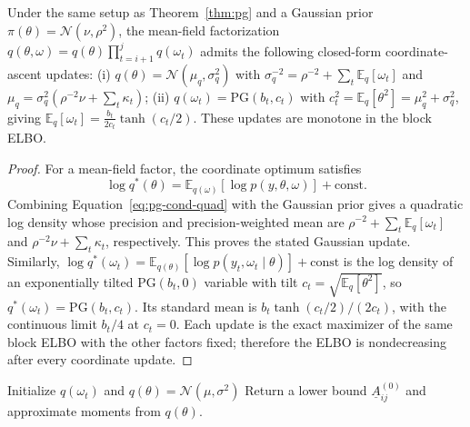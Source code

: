 \begin{proposition}
\label{prop:pg-mf}
Under the same setup as Theorem~\ref{thm:pg} and a Gaussian prior $\pi(\theta)=\mathcal{N}(\nu,\rho^2)$,
the mean-field factorization $q(\theta,\omega)=q(\theta)\prod_{t=i+1}^j q(\omega_t)$ admits the
following closed-form coordinate-ascent updates:
(i) $q(\theta)=\mathcal{N}(\mu_q,\sigma_q^2)$ with
$\sigma_q^{-2}=\rho^{-2}+\sum_t \mathbb{E}_q[\omega_t]$ and
$\mu_q=\sigma_q^2(\rho^{-2}\nu+\sum_t \kappa_t)$;
(ii) $q(\omega_t)=\mathrm{PG}(b_t, c_t)$ with $c_t^2=\mathbb{E}_q[\theta^2]=\mu_q^2+\sigma_q^2$,
giving $\mathbb{E}_q[\omega_t]=\tfrac{b_t}{2 c_t}\tanh(c_t/2)$. These updates are monotone in the
block ELBO.
\end{proposition}

\begin{proof}
For a mean-field factor, the coordinate optimum satisfies
\[
\log q^*(\theta)
=\mathbb E_{q(\omega)}\!\left[\log p(y,\theta,\omega)\right]+\mathrm{const}.
\]
Combining Equation~\eqref{eq:pg-cond-quad} with the Gaussian prior gives a quadratic log density
whose precision and precision-weighted mean are
$\rho^{-2}+\sum_t\mathbb E_q[\omega_t]$ and
$\rho^{-2}\nu+\sum_t\kappa_t$, respectively. This proves the stated Gaussian update. Similarly,
$\log q^*(\omega_t)=\mathbb E_{q(\theta)}[\log p(y_t,\omega_t\mid\theta)]+\mathrm{const}$
is the log density of an exponentially tilted $\mathrm{PG}(b_t,0)$ variable with tilt
$c_t=\sqrt{\mathbb E_q[\theta^2]}$, so $q^*(\omega_t)=\mathrm{PG}(b_t,c_t)$. Its standard mean
is $b_t\tanh(c_t/2)/(2c_t)$, with the continuous limit $b_t/4$ at $c_t=0$. Each update is the
exact maximizer of the same block ELBO with the other factors fixed; therefore the ELBO is
nondecreasing after every coordinate update.
\end{proof}

\begin{algorithm}[H]
\caption{GLMBlock\_PG\_VB$(y,m,i,j,\nu,\rho^2)$ \quad (Gaussian prior, PG mean-field)}
\label{alg:pg-vb}
Initialize $q(\omega_t)$ and $q(\theta)=\mathcal{N}(\mu,\sigma^2)$\;
Return a lower bound $\underline{A}^{(0)}_{ij}$ and approximate moments from $q(\theta)$.
\end{algorithm}

